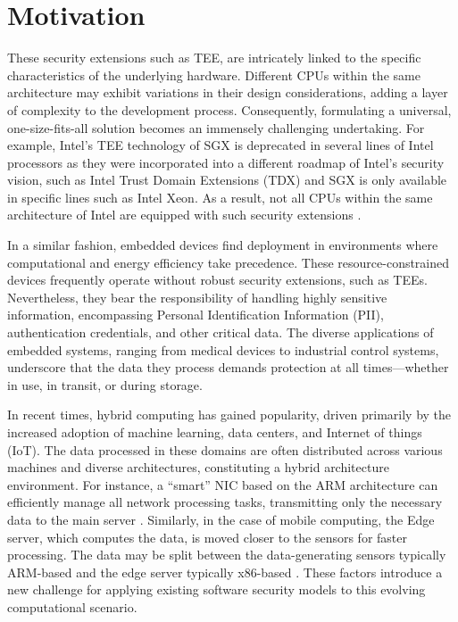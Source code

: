 \documentclass[article, doublespace,nopageskip]{VTthesis} %
\begin{document}
    \section{Motivation}
    These security extensions such as TEE, are intricately linked to the specific characteristics of the underlying hardware. Different CPUs within the same architecture may exhibit variations in their design considerations, adding a layer of complexity to the development process. Consequently, formulating a universal, one-size-fits-all solution becomes an immensely challenging undertaking. For example, Intel's TEE technology of SGX is deprecated in several lines of Intel processors as they were incorporated into a different roadmap of Intel's security vision, such as Intel Trust Domain Extensions (TDX) \cite{TDX} and SGX is only available in specific lines such as Intel Xeon. As a result, not all CPUs within the same architecture of Intel are equipped with such security extensions \cite{SGX-depreciation} .


    In a similar fashion, embedded devices find deployment in environments where computational and energy efficiency take precedence. These resource-constrained devices frequently operate without robust security extensions, such as TEEs. Nevertheless, they bear the responsibility of handling highly sensitive information, encompassing Personal Identification Information (PII), authentication credentials, and other critical data. The diverse applications of embedded systems, ranging from medical devices to industrial control systems, underscore that the data they process demands protection at all times—whether in use, in transit, or during storage.

    In recent times, hybrid computing has gained popularity, driven primarily by the increased adoption of machine learning, data centers, and Internet of things (IoT). The data processed in these domains are often distributed across various machines and diverse architectures, constituting a hybrid architecture environment. For instance, a ``smart'' NIC based on the ARM architecture can efficiently manage all network processing tasks, transmitting only the necessary data to the main server \cite{xenic:sosp21}. Similarly, in the case of mobile computing, the Edge server, which computes the data, is moved closer to the sensors for faster processing. The data may be split between the data-generating sensors typically ARM-based and the edge server typically x86-based \cite{vigilia:edge18}. These factors introduce a new challenge for applying existing software security models to this evolving computational scenario.
\end{document}
